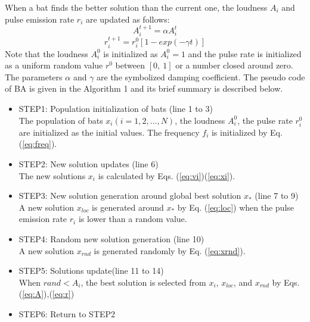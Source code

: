 \documentclass[conference]{IEEEtran}
\begin{document}
When a bat finds the better solution than the current one, the loudness $A_i$ and pulse emission rate $r_i$ are updated as follows:
\begin{equation}
A_i^{t+1}=\alpha A_i^t
\label{eq:A}
\end{equation}
\begin{equation}
r_i^{t+1}=r_i^0[1-exp(-\gamma t)]
\label{eq:r}
\end{equation}
Note that the loudness $A_i^0$ is initialized as $A_i^0=1$ and the pulse rate is initialized as a uniform random value $r^0$ between $[0, \ 1]$ or a number closed around zero. The parameters $\alpha$ and $\gamma$ are the symbolized damping coefficient. The pseudo code of BA is given in the Algorithm 1 and its brief summary is described below.

\begin{itemize}
\item STEP1: Population initialization of bats (line 1 to 3)\\
The population of bats ${x_i}(i=1, 2, ..., N)$, the loudness ${A_i^0}$, the pulse rate ${r_i^0}$ are initialized as the initial values. The frequency ${f_i}$ is initialized by Eq.(\ref{eq:freq}).
\item STEP2: New solution updates (line 6)\\
The new solutions ${x_i}$ is calculated by Eqs. (\ref{eq:vi})(\ref{eq:xi}).
\item STEP3: New solution generation around global best solution ${x_*}$ (line 7 to 9)\\
A new solution $x_{loc}$ is generated around $x_*$ by Eq. (\ref{eq:loc}) when the pulse emission rate $r_i$ is lower than a random value.
\item STEP4: Random new solution generation (line 10)\\
A new solution ${x_{rnd}}$ is generated randomly by Eq. (\ref{eq:xrnd}).  
\item STEP5: Solutions update(line 11 to 14)\\
When ${rand < A_i}$, the best solution is selected from $x_i$, ${x_{loc}}$, and ${x_{rnd}}$ by Eqs.(\ref{eq:A}),(\ref{eq:r})
\item STEP6: Return to STEP2 
\end{itemize}
\end{document}
